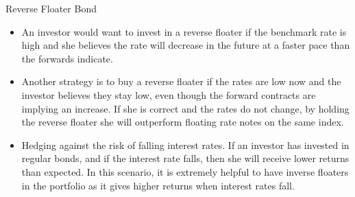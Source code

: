 \documentclass{beamer}
\begin{document}
\begin{frame}{Reverse Floater Bond}
	\begin{itemize}
		\item<1-> An investor would want to invest in a reverse floater if the benchmark rate is high and she believes the rate will decrease in the future at a faster pace than the forwards indicate. 
		\item<2-> Another strategy is to buy a reverse floater if the rates are low now and the investor believes they stay low, even though the forward contracts are implying an increase. If she is correct and the rates do not change, by holding the reverse floater she will outperform floating rate notes on the same index.
		\item<3-> Hedging against the risk of falling interest rates. If an investor has invested in regular bonds, and if the interest rate falls, then she will receive lower returns than expected. In this scenario, it is extremely helpful to have inverse floaters in the portfolio as it gives higher returns when interest rates fall.
	\end{itemize}
\end{frame}

\end{document}
